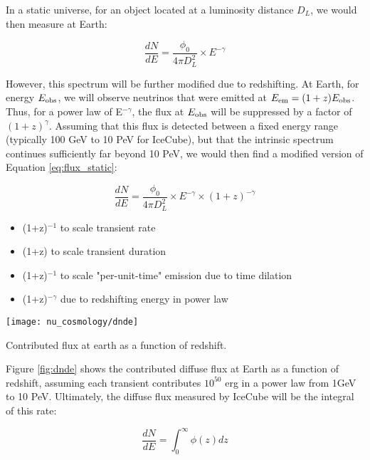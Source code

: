 In a static universe, for an object located at a luminosity distance $D_{L}$, we would then measure at Earth:

\begin{equation}
\frac{dN}{dE} = \frac{\phi_{0}}{4 \pi D_{L}^{2}} \times E^{-\gamma}
\label{eq:flux_static}
\end{equation}

However, this spectrum will be further modified due to redshifting. At Earth, for energy $E_{\textup{obs}}$, we will observe neutrinos that were emitted at $E_{\textup{em}} = (1+z) E_{\textup{obs}}$. Thus, for a power law of E$^{-\gamma}$, the flux at $E_{\textup{obs}}$ will be suppressed by a factor of $(1+z) ^{\gamma}$. Assuming that this flux is detected between a fixed energy range (typically 100 GeV to 10 PeV for IceCube), but that the intrinsic spectrum continues sufficiently far beyond 10 PeV, we would then find a modified version of Equation \ref{eq:flux_static}:

\begin{equation}
\frac{dN}{dE} = \frac{\phi_{0}}{4 \pi D_{L}^{2}} \times E^{-\gamma}  \times (1+z)^{-\gamma}
\label{eq:flux_redshift}
\end{equation}

\begin{itemize}
	\item (1+z)$^{-1}$ to scale transient rate
	\item (1+z) to scale transient duration
	\item (1+z)$^{-1}$ to scale "per-unit-time" emission due to time dilation
	\item (1+z)$^{-\gamma}$ due to redshifting energy in power law
\end{itemize}

\begin{marginfigure}
	\centering \texttt{[image: nu\_cosmology/dnde]}
	\caption{Contributed flux at earth as a function of redshift.}
	\label{fig:dnde}
\end{marginfigure}

Figure \ref{fig:dnde} shows the contributed diffuse flux at Earth as a function of redshift, assuming each transient contributes $10^{50}$ erg in a power law from 1GeV to 10 PeV. Ultimately, the diffuse flux measured by IceCube will be the integral of this rate: 

\begin{equation}
\frac{dN}{dE} = \int_{0}^{\infty} \phi(z) dz
\label{eq:nu_flux_tot}
\end{equation}

